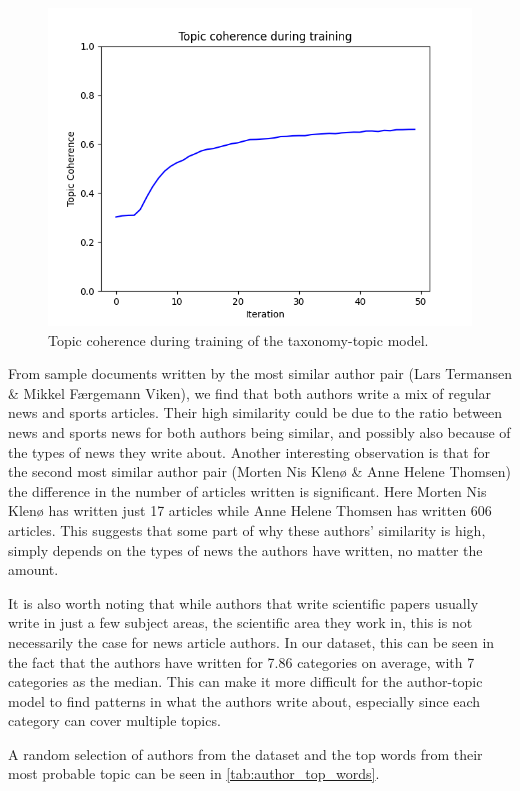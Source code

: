 \begin{figure}[b]
	\centering
	\includegraphics[width= \linewidth]{figures/pachinko_training.PNG}
	\caption{Topic coherence during training of the taxonomy-topic model.}
	\label{fig:pachinko_train}
\end{figure}

From sample documents written by the most similar author pair (Lars Termansen \& Mikkel Færgemann Viken), we find that both authors write a mix of regular news and sports articles.
Their high similarity could be due to the ratio between news and sports news for both authors being similar, and possibly also because of the types of news they write about.
Another interesting observation is that for the second most similar author pair (Morten Nis Klenø \& Anne Helene Thomsen) the difference in the number of articles written is significant.
Here Morten Nis Klenø has written just 17 articles while Anne Helene Thomsen has written 606 articles.
This suggests that some part of why these authors' similarity is high, simply depends on the types of news the authors have written, no matter the amount.

It is also worth noting that while authors that write scientific papers usually write in just a few subject areas, the scientific area they work in, this is not necessarily the case for news article authors.
In our dataset, this can be seen in the fact that the authors have written for 7.86 categories on average, with 7 categories as the median.
This can make it more difficult for the author-topic model to find patterns in what the authors write about, especially since each category can cover multiple topics.

A random selection of authors from the dataset and the top words from their most probable topic can be seen in \autoref{tab:author_top_words}.
